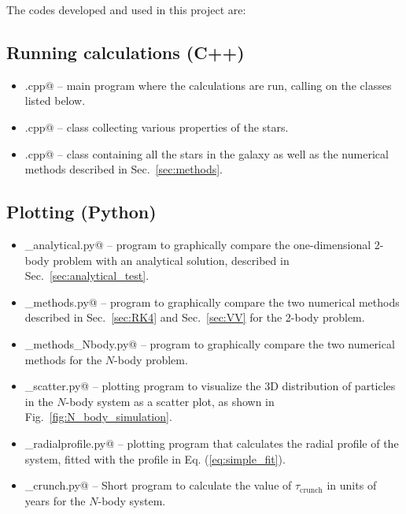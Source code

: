 \documentclass{article}
\begin{document}
\begin{multicols}{2}
The codes developed and used in this project are: 


\subsection{Running calculations (C++)}

\begin{itemize}
	\item \verb@main.cpp@ -- main program where the calculations are run, calling on the classes listed below. 
	\item \verb@star.cpp@ -- class collecting various properties of the stars.
	\item \verb@galaxy.cpp@ -- class containing all the stars in the galaxy as well as the numerical methods described in Sec.~\ref{sec:methods}.
\end{itemize}


\subsection{Plotting (Python)}

\begin{itemize}
	\item \verb@plotting_analytical.py@ -- program to graphically compare the one-dimensional 2-body problem with an analytical solution, described in Sec.~\ref{sec:analytical_test}.
	\item \verb@plot_methods.py@ -- program to graphically compare the two numerical methods described in Sec.~\ref{sec:RK4} and Sec.~\ref{sec:VV} for the 2-body problem.
	\item \verb@plot_methods_Nbody.py@ -- program to graphically compare the two numerical methods for the $N$-body problem.
	\item \verb@plotting_scatter.py@ -- plotting program to visualize the 3D distribution of particles in the $N$-body system as a scatter plot, as shown in Fig.~\ref{fig:N_body_simulation}. 
	\item \verb@plotting_radialprofile.py@ -- plotting program that calculates the radial profile of the system, fitted with the profile in Eq. (\ref{eq:simple_fit}). %
	\item \verb@t_crunch.py@ -- Short program to calculate the value of $\tau_{\mathrm{crunch}}$ in units of years for the $N$-body system.
\end{itemize}




\end{multicols}
\end{document}
